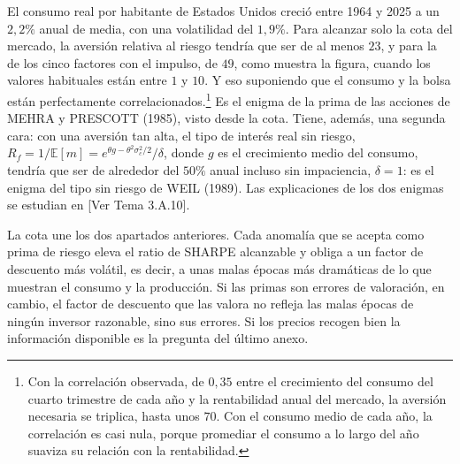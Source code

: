 \documentclass[10pt,a4paper]{article}
\newcommand{\authorfont}[1]{{\fontfamily{EBGaramond-TLF}\selectfont #1}}
\newcounter{anexo}
\begin{document}
El consumo real por habitante de Estados Unidos creció entre 1964 y 2025 a un $2{,}2\%$ anual de media, con una volatilidad del $1{,}9\%$. Para alcanzar solo la cota del mercado, la aversión relativa al riesgo tendría que ser de al menos $23$, y para la de los cinco factores con el impulso, de $49$, como muestra la figura, cuando los valores habituales están entre $1$ y $10$. Y eso suponiendo que el consumo y la bolsa están perfectamente correlacionados.\footnote{%
    Con la correlación observada, de $0{,}35$ entre el crecimiento del consumo del cuarto trimestre de cada año y la rentabilidad anual del mercado, la aversión necesaria se triplica, hasta unos $70$. Con el consumo medio de cada año, la correlación es casi nula, porque promediar el consumo a lo largo del año suaviza su relación con la rentabilidad.
} Es el enigma de la prima de las acciones de MEHRA y PRESCOTT (1985), visto desde la cota. Tiene, además, una segunda cara: con una aversión tan alta, el tipo de interés real sin riesgo, $R_f=1/\mathbb E[m]=e^{\theta g-\theta^2\sigma_c^2/2}/\delta$, donde $g$ es el crecimiento medio del consumo, tendría que ser de alrededor del $50\%$ anual incluso sin impaciencia, $\delta=1$: es el enigma del tipo sin riesgo de WEIL (1989). Las explicaciones de los dos enigmas se estudian en [\authorfont{Ver Tema 3.A.10}].

La cota une los dos apartados anteriores. Cada anomalía que se acepta como prima de riesgo eleva el ratio de SHARPE alcanzable y obliga a un factor de descuento más volátil, es decir, a unas malas épocas más dramáticas de lo que muestran el consumo y la producción. Si las primas son errores de valoración, en cambio, el factor de descuento que las valora no refleja las malas épocas de ningún inversor razonable, sino sus errores. Si los precios recogen bien la información disponible es la pregunta del último anexo.
\end{document}
